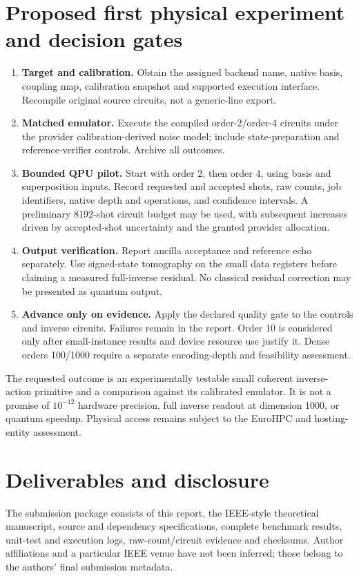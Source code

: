 \documentclass[11pt,a4paper]{article}
\begin{document}
\section{Proposed first physical experiment and decision gates}
\begin{enumerate}
\item \textbf{Target and calibration.} Obtain the assigned backend name,
native basis, coupling map, calibration snapshot and supported execution
interface. Recompile original source circuits, not a generic-line export.
\item \textbf{Matched emulator.} Execute the compiled order-2/order-4
circuits under the provider calibration-derived noise model; include
state-preparation and reference-verifier controls. Archive all outcomes.
\item \textbf{Bounded QPU pilot.} Start with order 2, then order 4,
using basis and superposition inputs. Record requested and accepted
shots, raw counts, job identifiers, native depth and operations, and
confidence intervals. A preliminary 8192-shot circuit budget may be
used, with subsequent increases driven by accepted-shot uncertainty
and the granted provider allocation.
\item \textbf{Output verification.} Report ancilla acceptance and
reference echo separately. Use signed-state tomography on the small
data registers before claiming a measured full-inverse residual.
No classical residual correction may be presented as quantum output.
\item \textbf{Advance only on evidence.} Apply the declared quality gate
to the controls and inverse circuits. Failures remain in the report.
Order 10 is considered only after small-instance results and device
resource use justify it. Dense orders 100/1000 require a separate
encoding-depth and feasibility assessment.
\end{enumerate}

The requested outcome is an experimentally testable small coherent
inverse-action primitive and a comparison against its calibrated emulator.
It is not a promise of $10^{-12}$ hardware precision, full inverse readout
at dimension 1000, or quantum speedup. Physical access remains subject to
the EuroHPC and hosting-entity assessment.

\section*{Deliverables and disclosure}
The submission package consists of this report, the IEEE-style theoretical
manuscript, source and dependency specifications, complete benchmark
results, unit-test and execution logs, raw-count/circuit evidence and
checksums. Author affiliations and a particular IEEE venue have not been
inferred; those belong to the authors' final submission metadata.
\end{document}
